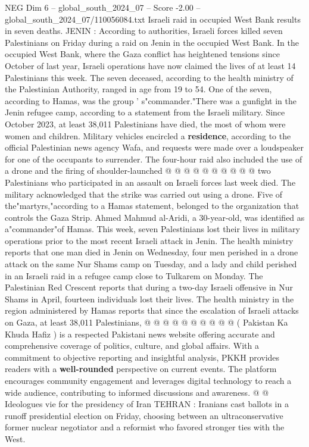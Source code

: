 \begin{textsample}{NEG Dim 6 – global\_south\_2024\_07 – Score -2.00 – global\_south\_2024\_07/110056084.txt}  \label{ex:f6_neg_117}
Israeli raid in occupied West Bank results in seven deaths.
JENIN : According to authorities, Israeli forces killed seven Palestinians on Friday during a raid on Jenin in the occupied West Bank.
In the occupied West Bank, where the Gaza conflict has heightened tensions since October of last year, Israeli operations have now claimed the lives of at least 14 Palestinians this week.
The seven deceased, according to the health ministry of the Palestinian Authority, ranged in age from 19 to 54.
One of the seven, according to Hamas, was the group ' s"commander."There was a gunfight in the Jenin refugee camp, according to a statement from the Israeli military.
Since October 2023, at least 38,011 Palestinians have died, the most of whom were women and children.
Military vehicles encircled a \textbf{residence}, according to the official Palestinian news agency Wafa, and requests were made over a loudspeaker for one of the occupants to surrender.
The four-hour raid also included the use of a drone and the firing of shoulder-launched @ @ @ @ @ @ @ @ @ @ two Palestinians who participated in an assault on Israeli forces last week died.
The military acknowledged that the strike was carried out using a drone.
Five of the"martyrs,"according to a Hamas statement, belonged to the organization that controls the Gaza Strip.
Ahmed Mahmud al-Aridi, a 30-year-old, was identified as a"commander"of Hamas.
This week, seven Palestinians lost their lives in military operations prior to the most recent Israeli attack in Jenin.
The health ministry reports that one man died in Jenin on Wednesday, four men perished in a drone attack on the same Nur Shams camp on Tuesday, and a lady and child perished in an Israeli raid in a refugee camp close to Tulkarem on Monday.
The Palestinian Red Crescent reports that during a two-day Israeli offensive in Nur Shams in April, fourteen individuals lost their lives.
The health ministry in the region administered by Hamas reports that since the escalation of Israeli attacks on Gaza, at least 38,011 Palestinians, @ @ @ @ @ @ @ @ @ @ ( Pakistan Ka Khuda Hafiz ) is a respected Pakistani news website offering accurate and comprehensive coverage of politics, culture, and global affairs.
With a commitment to objective reporting and insightful analysis, PKKH provides readers with a \textbf{well-rounded} perspective on current events.
The platform encourages community engagement and leverages digital technology to reach a wide audience, contributing to informed discussions and awareness. @ @ Ideologues vie for the presidency of Iran TEHRAN : Iranians cast ballots in a runoff presidential election on Friday, choosing between an ultraconservative former nuclear negotiator and a reformist who favored stronger ties with the West.

\end{textsample}
